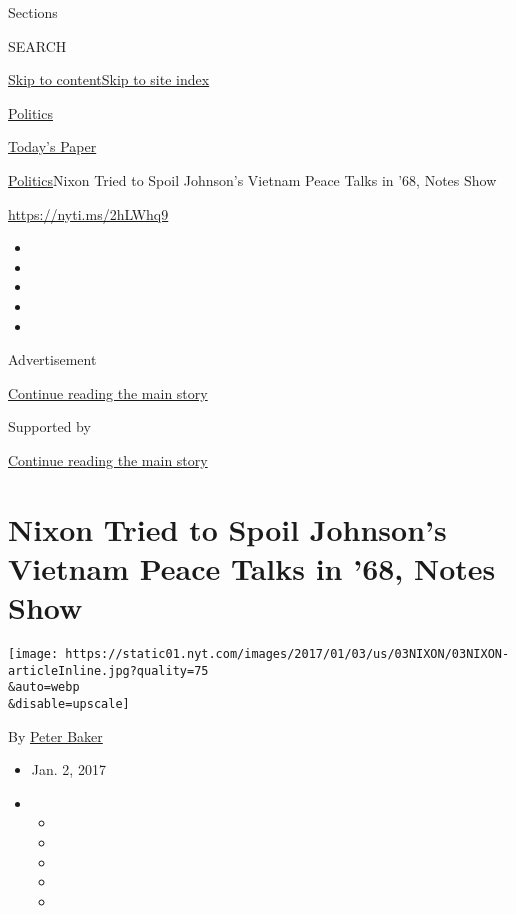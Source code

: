 Sections

SEARCH

\protect\hyperlink{site-content}{Skip to
content}\protect\hyperlink{site-index}{Skip to site index}

\href{https://www.nytimes.com/section/politics}{Politics}

\href{https://myaccount.nytimes.com/auth/login?response_type=cookie\&client_id=vi}{}

\href{https://www.nytimes.com/section/todayspaper}{Today's Paper}

\href{/section/politics}{Politics}\textbar{}Nixon Tried to Spoil
Johnson's Vietnam Peace Talks in '68, Notes Show

\href{https://nyti.ms/2hLWhq9}{https://nyti.ms/2hLWhq9}

\begin{itemize}
\item
\item
\item
\item
\item
\end{itemize}

Advertisement

\protect\hyperlink{after-top}{Continue reading the main story}

Supported by

\protect\hyperlink{after-sponsor}{Continue reading the main story}

\hypertarget{nixon-tried-to-spoil-johnsons-vietnam-peace-talks-in-68-notes-show}{%
\section{Nixon Tried to Spoil Johnson's Vietnam Peace Talks in '68,
Notes
Show}\label{nixon-tried-to-spoil-johnsons-vietnam-peace-talks-in-68-notes-show}}

\texttt{[image: https://static01.nyt.com/images/2017/01/03/us/03NIXON/03NIXON-articleInline.jpg?quality=75\\\&auto=webp\\\&disable=upscale]}

By \href{http://www.nytimes.com/by/peter-baker}{Peter Baker}

\begin{itemize}
\item
  Jan. 2, 2017
\item
  \begin{itemize}
  \item
  \item
  \item
  \item
  \item
  \end{itemize}
\end{itemize}

